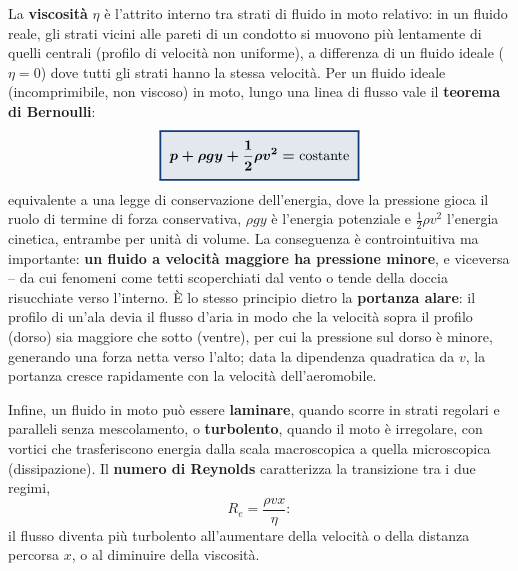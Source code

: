 \documentclass[a4paper,11pt]{article}
\newcommand{\keyeq}[1]{{\setlength{\fboxsep}{6pt}\setlength{\fboxrule}{1.3pt}\fcolorbox{chapblue}{chapblue!12}{\boldmath$\displaystyle #1$}}}
\begin{document}
La \textbf{viscosità} $\eta$ è l'attrito interno tra strati di fluido in moto relativo: in un fluido reale, gli strati vicini alle pareti di un condotto si muovono più lentamente di quelli centrali (profilo di velocità non uniforme), a differenza di un fluido ideale ($\eta=0$) dove tutti gli strati hanno la stessa velocità. Per un fluido ideale (incomprimibile, non viscoso) in moto, lungo una linea di flusso vale il \textbf{teorema di Bernoulli}:
\[
\keyeq{p + \rho gy + \frac12\rho v^2 = \text{costante}}
\]
equivalente a una legge di conservazione dell'energia, dove la pressione gioca il ruolo di termine di forza conservativa, $\rho gy$ è l'energia potenziale e $\frac12\rho v^2$ l'energia cinetica, entrambe per unità di volume. La conseguenza è controintuitiva ma importante: \textbf{un fluido a velocità maggiore ha pressione minore}, e viceversa -- da cui fenomeni come tetti scoperchiati dal vento o tende della doccia risucchiate verso l'interno. È lo stesso principio dietro la \textbf{portanza alare}: il profilo di un'ala devia il flusso d'aria in modo che la velocità sopra il profilo (dorso) sia maggiore che sotto (ventre), per cui la pressione sul dorso è minore, generando una forza netta verso l'alto; data la dipendenza quadratica da $v$, la portanza cresce rapidamente con la velocità dell'aeromobile.

Infine, un fluido in moto può essere \textbf{laminare}, quando scorre in strati regolari e paralleli senza mescolamento, o \textbf{turbolento}, quando il moto è irregolare, con vortici che trasferiscono energia dalla scala macroscopica a quella microscopica (dissipazione). Il \textbf{numero di Reynolds} caratterizza la transizione tra i due regimi,
\[
R_e = \frac{\rho v x}{\eta}:
\]
il flusso diventa più turbolento all'aumentare della velocità o della distanza percorsa $x$, o al diminuire della viscosità.
\end{document}
